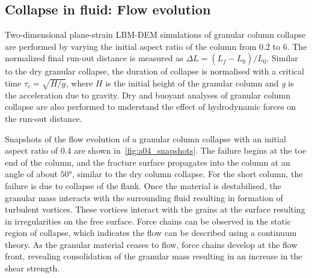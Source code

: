 \subsection{Collapse in fluid: Flow evolution}
\label{sec:collapse_fluid_evolution}
Two-dimensional plane-strain LBM-DEM simulations of granular column 
collapse are performed by varying the initial aspect ratio of the column from 
0.2 to 6. The normalized final run-out distance is measured as $\Delta L = 
(L_{\textit{f}}-L_{\textit{0}})/L_{\textit{0}}$. Similar to the dry granular 
collapse, the duration of collapse is normalised with a critical time $\tau_c 
= \sqrt{H/g}$, where $H$ is the initial height of the granular column and 
\textit{g} is 
the acceleration due to gravity.  Dry and buoyant analyses of granular column 
collapse are also performed to understand the effect of hydrodynamic forces on 
the run-out distance.

Snapshots of the flow evolution of a granular column collapse with an initial 
aspect ratio of 0.4 are shown in~\cref{fig:a04_snapshots}. The failure begins 
at the toe end of the column, and the fracture surface propagates into the 
column at an angle of about $50\si{\degree}$, similar to the dry column 
collapse. For the 
short column, the failure is due to collapse of the flank. Once the material 
is destabilised, the granular mass interacts with the surrounding fluid 
resulting in formation of turbulent vortices. These vortices interact with the 
grains at the surface resulting in irregularities on the free surface. Force 
chains can be observed in the static region of collapse, which indicates the 
flow can be described using a continuum theory. As the granular material ceases 
to flow, 
force chains develop at the flow front, revealing consolidation of the granular 
mass resulting in an increase in the shear strength. 

